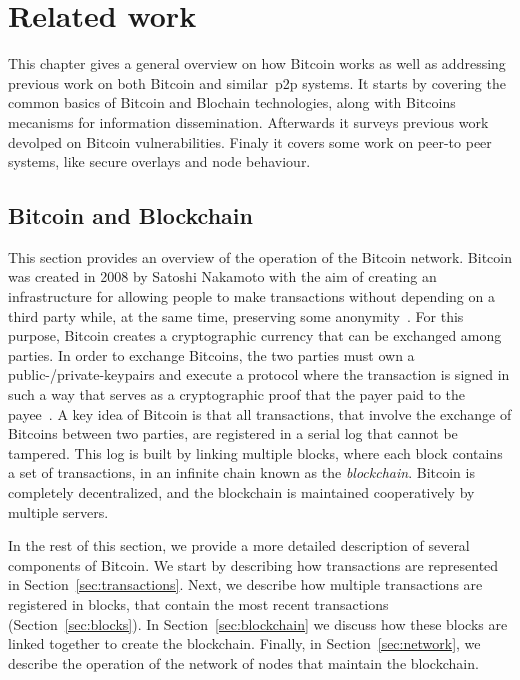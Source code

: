 \chapter{Related work}
\label{chap:rw}

This chapter gives a general overview on how Bitcoin works as well as addressing previous work on both Bitcoin and similar~\acrlong{p2p} systems. It starts by covering the common basics of Bitcoin and Blochain technologies, along with Bitcoins mecanisms for information dissemination. Afterwards it surveys previous work devolped on Bitcoin vulnerabilities. Finaly it covers some work on peer-to peer systems, like secure overlays and  node behaviour.

\section{Bitcoin and Blockchain}
\label{sec:bb}
This section provides an overview of the operation of the Bitcoin network. Bitcoin was created in 2008 by Satoshi Nakamoto with the aim of creating an infrastructure for allowing people to make transactions without depending on a third party while, at the same time, preserving some anonymity~\cite{nakamoto2008bitcoin}. For this purpose, Bitcoin creates a cryptographic currency that can be exchanged among parties. In order to exchange Bitcoins, the two parties must own a public-/private-keypairs and execute a protocol where the transaction is signed in such a way that serves as a cryptographic proof that the payer paid to the payee~\cite{decker2013information}. A key idea of Bitcoin is that all transactions, that involve the exchange of Bitcoins between two parties, are registered in a serial log that cannot be tampered. This log is built by linking multiple blocks, where each block contains a set of transactions, in an infinite chain known as the \emph{blockchain}. Bitcoin is completely decentralized, and the blockchain is maintained cooperatively by multiple servers.

In the rest of this section, we provide a more detailed description of several components of Bitcoin. We start by describing how transactions are represented in Section~\ref{sec:transactions}. Next, we describe how multiple transactions are registered in blocks, that contain the most recent transactions (Section~\ref{sec:blocks}). In Section~\ref{sec:blockchain} we discuss how these blocks are linked together to create the blockchain. Finally, in Section~\ref{sec:network}, we describe the operation of the network of nodes that maintain the blockchain.

